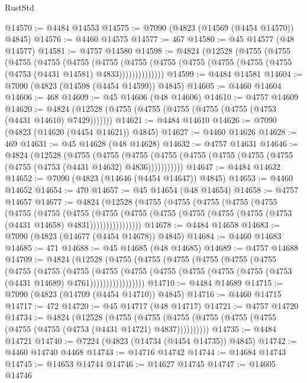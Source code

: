\begin{lexlean}{RustStd}
\begin{coremodule}
@14570 := @4484 @14553
@14575 := @7090 (@4823 (@14569 (@4454 @14570)) @4845)
@14576 := @4460 @14575
@14577 := 467
@14580 := @45 @14577 (@48 @14577)
@14581 := @4757 @14580
@14598 := @4824
    (@12528
      (@4755
        (@4755
          (@4755
            (@4755
              (@4755
                (@4755
                  (@4755
                    (@4755 (@4755 (@4755 (@4755 (@4755 (@4753 (@4431 @14581) @4833))))))))))))))
@14599 := @4484 @14581
@14604 := @7090 (@4823 (@14598 (@4454 @14599)) @4845)
@14605 := @4460 @14604
@14606 := 468
@14609 := @45 @14606 (@48 @14606)
@14610 := @4757 @14609
@14620 := @4824 (@12528 (@4755 (@4755 (@4755 (@4755 (@4755 (@4753 (@4431 @14610) @7429)))))))
@14621 := @4484 @14610
@14626 := @7090 (@4823 (@14620 (@4454 @14621)) @4845)
@14627 := @4460 @14626
@14628 := 469
@14631 := @45 @14628 (@48 @14628)
@14632 := @4757 @14631
@14646 := @4824
    (@12528
      (@4755
        (@4755
          (@4755 (@4755 (@4755 (@4755 (@4755 (@4755 (@4755 (@4753 (@4431 @14632) @4836)))))))))))
@14647 := @4484 @14632
@14652 := @7090 (@4823 (@14646 (@4454 @14647)) @4845)
@14653 := @4460 @14652
@14654 := 470
@14657 := @45 @14654 (@48 @14654)
@14658 := @4757 @14657
@14677 := @4824
    (@12528
      (@4755
        (@4755
          (@4755
            (@4755
              (@4755
                (@4755
                  (@4755
                    (@4755
                      (@4755
                        (@4755
                          (@4755 (@4755 (@4755 (@4755 (@4753 (@4431 @14658) @4831))))))))))))))))
@14678 := @4484 @14658
@14683 := @7090 (@4823 (@14677 (@4454 @14678)) @4845)
@14684 := @4460 @14683
@14685 := 471
@14688 := @45 @14685 (@48 @14685)
@14689 := @4757 @14688
@14709 := @4824
    (@12528
      (@4755
        (@4755
          (@4755
            (@4755
              (@4755
                (@4755
                  (@4755
                    (@4755
                      (@4755
                        (@4755
                          (@4755
                            (@4755 (@4755 (@4755 (@4755 (@4753 (@4431 @14689) @4761)))))))))))))))))
@14710 := @4484 @14689
@14715 := @7090 (@4823 (@14709 (@4454 @14710)) @4845)
@14716 := @4460 @14715
@14717 := 472
@14720 := @45 @14717 (@48 @14717)
@14721 := @4757 @14720
@14734 := @4824
    (@12528
      (@4755 (@4755 (@4755 (@4755 (@4755 (@4755 (@4755 (@4755 (@4753 (@4431 @14721) @4837))))))))))
@14735 := @4484 @14721
@14740 := @7224 (@4823 (@14734 (@4454 @14735)) @4845)
@14742 := @4460 @14740 @4468
@14743 := @14716 @14742
@14744 := @14684 @14743
@14745 := @14653 @14744
@14746 := @14627 @14745
@14747 := @14605 @14746

\end{coremodule}
\end{lexlean}
